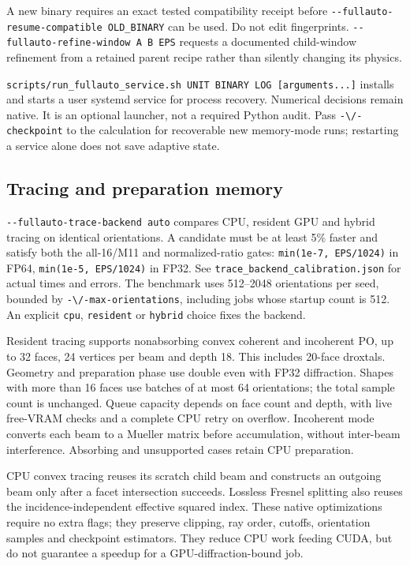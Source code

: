 A new binary requires an exact tested compatibility receipt before
\texttt{-\/-fullauto-resume-compatible\ OLD\_BINARY} can be used. Do not
edit fingerprints. \texttt{-\/-fullauto-refine-window\ A\ B\ EPS}
requests a documented child-window refinement from a retained parent
recipe rather than silently changing its physics.

\texttt{scripts/run\_fullauto\_service.sh\ UNIT\ BINARY\ LOG\ {[}arguments...{]}}
installs and starts a user systemd service for process recovery.
Numerical decisions remain native. It is an optional launcher, not a
required Python audit. Pass \nolinkurl{-\/-checkpoint} to the calculation
for recoverable new memory-mode runs; restarting a service alone does
not save adaptive state.

\subsection{Tracing and preparation
memory}\label{tracing-and-preparation-memory}

\texttt{-\/-fullauto-trace-backend\ auto} compares CPU, resident GPU and
hybrid tracing on identical orientations. A candidate must be at least
5\% faster and satisfy both the all-16/M11 and normalized-ratio gates:
\texttt{min(1e-7,\ EPS/1024)} in FP64, \texttt{min(1e-5,\ EPS/1024)} in
FP32. See \nolinkurl{trace_backend_calibration.json} for actual times and
errors. The benchmark uses 512--2048 orientations per seed, bounded by
\nolinkurl{-\/-max-orientations}, including jobs whose startup count is
512. An explicit \texttt{cpu}, \texttt{resident} or \texttt{hybrid}
choice fixes the backend.

Resident tracing supports nonabsorbing convex coherent and incoherent
PO, up to 32 faces, 24 vertices per beam and depth 18. This includes
20-face droxtals. Geometry and preparation phase use double even with
FP32 diffraction. Shapes with more than 16 faces use batches of at most
64 orientations; the total sample count is unchanged. Queue capacity
depends on face count and depth, with live free-VRAM checks and a
complete CPU retry on overflow. Incoherent mode converts each beam to a
Mueller matrix before accumulation, without inter-beam interference.
Absorbing and unsupported cases retain CPU preparation.

CPU convex tracing reuses its scratch child beam and constructs an
outgoing beam only after a facet intersection succeeds. Lossless Fresnel
splitting also reuses the incidence-independent effective squared index.
These native optimizations require no extra flags; they preserve
clipping, ray order, cutoffs, orientation samples and checkpoint
estimators. They reduce CPU work feeding CUDA, but do not guarantee a
speedup for a GPU-diffraction-bound job.

